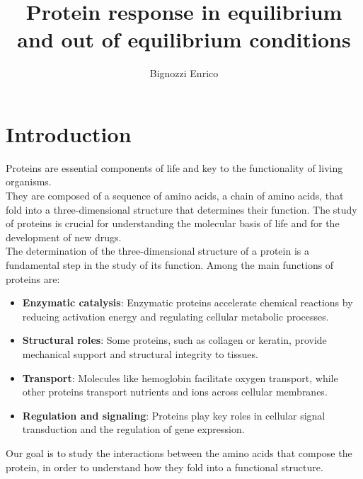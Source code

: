 \documentclass[English, Lau, oneside]{sapthesis}
\title{Protein response in equilibrium and out of equilibrium conditions}
\author{Bignozzi Enrico}
\begin{document}
\maketitle

\tableofcontents



    

\dedication{}

\newpage
\null
\thispagestyle{empty}
\newpage




\newpage
\null
\thispagestyle{empty}
\newpage



\chapter{Introduction}
\noindent
Proteins are essential components of life and key to the functionality of living organisms. \cite{ref} \\
They are composed of a sequence of amino acids, a chain of amino acids, that fold into a three-dimensional structure that determines their function. 
The study of proteins is crucial for understanding the molecular basis of life and for the development of new drugs.\\
The determination of the three-dimensional structure of a protein is a fundamental step in the study of its function.
Among the main functions of proteins are:\cite{ref}
\begin{itemize}
    \item \textbf{Enzymatic catalysis}: Enzymatic proteins accelerate chemical reactions by reducing activation energy and regulating cellular metabolic processes.
    \item \textbf{Structural roles}: Some proteins, such as collagen or keratin, provide mechanical support and structural integrity to tissues.
    \item \textbf{Transport}: Molecules like hemoglobin facilitate oxygen transport, while other proteins transport nutrients and ions across cellular membranes.
    \item \textbf{Regulation and signaling}: Proteins play key roles in cellular signal transduction and the regulation of gene expression.
\end{itemize}
Our goal is to study the interactions between the amino acids that compose the protein, 
in order to understand how they fold into a functional structure.
\end{document}
